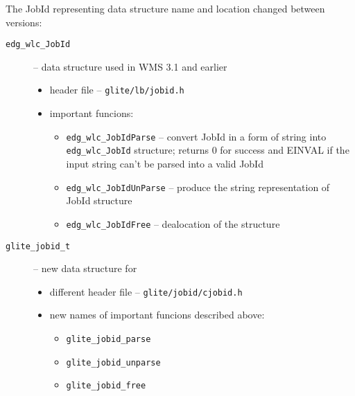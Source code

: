 The JobId representing data structure name and location
changed between \LB versions:

\begin{description}
 \item [\texttt{edg\_wlc\_JobId}] -- data structure used in WMS 3.1 and earlier
  \begin{itemize}
   \item header file -- \texttt{glite/lb/jobid.h}
   \item important funcions:
    \begin{itemize}
     \item \texttt{edg\_wlc\_JobIdParse} -- convert JobId in a form of
      string into \texttt{edg\_wlc\_JobId} structure; returns 0 for
      success and EINVAL if the input string can't be parsed into a valid JobId
     \item \texttt{edg\_wlc\_JobIdUnParse} -- produce the string
      representation of JobId structure
     \item \texttt{edg\_wlc\_JobIdFree} -- dealocation of the structure
    \end{itemize}
  \end{itemize} 
 \item [\texttt{glite\_jobid\_t}] -- new data structure for  
  \begin{itemize}
   \item different header file -- \texttt{glite/jobid/cjobid.h}
   \item new names of important funcions described above:
    \begin{itemize}
     \item \texttt{glite\_jobid\_parse}
     \item \texttt{glite\_jobid\_unparse}
     \item \texttt{glite\_jobid\_free}
    \end{itemize}
  \end{itemize}
\end{description}

